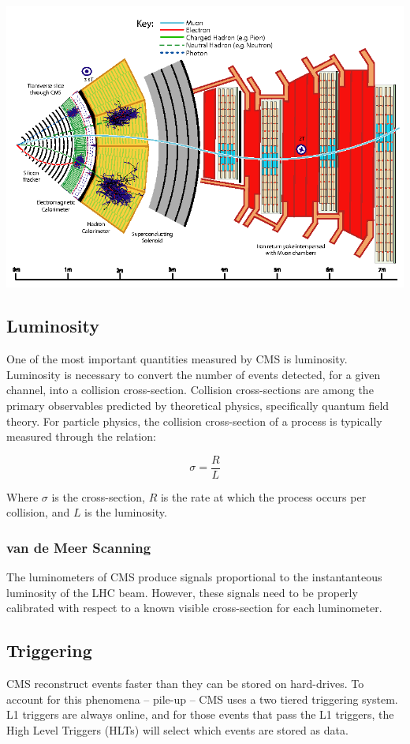 \centerline{
\includegraphics[width=5.5in]{Chapter3/importfigs/Figure_001.png}
}


\subsection{Luminosity}

One of the most important quantities measured by CMS is luminosity. Luminosity is necessary to convert the number of events detected, for a given channel, into a collision cross-section. Collision cross-sections are among the primary observables predicted by theoretical physics, specifically quantum field theory. For particle physics, the collision cross-section of a process is typically measured through the relation:

\begin{equation}
\sigma  = \frac{R}{\mathit{L}}
\end{equation}

Where $\sigma$ is the cross-section, $R$ is the rate at which the process occurs per collision, and $L$ is the luminosity.  

\subsubsection{van de Meer Scanning}

The luminometers of CMS produce signals proportional to the instantanteous luminosity of the LHC beam. However, these signals need to be properly calibrated with respect to a known visible cross-section for each luminometer. 

\subsection{Triggering}

CMS reconstruct events faster than they can be stored on hard-drives. To account for this phenomena -- pile-up -- CMS uses a two tiered triggering system. L1 triggers are always online, and for those events that pass the L1 triggers, the High Level Triggers (HLTs) will select which events are stored as data.